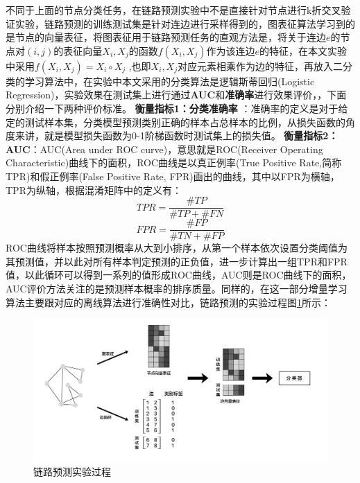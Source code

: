 不同于上面的节点分类任务，在链路预测实验中不是直接针对节点进行k折交叉验证实验，链路预测的训练测试集是针对连边进行采样得到的，图表征算法学习到的是节点的向量表征，将图表征用于链路预测任务的直观方法是，将关于连边$e$的节点对$(i,j)$的表征向量$X_i,X_j$的函数$f(X_i, X_j)$作为该连边$e$的特征，在本文实验中采用$f(X_i, X_j) = X_i\circ X_j$ ,也即$X_i, X_j$对应元素相乘作为边的特征，再放入二分类的学习算法中，在实验中本文采用的分类算法是逻辑斯蒂回归(Logistic Regression)，实验效果在测试集上进行通过\textbf{AUC}和\textbf{准确率}进行效果评价，，下面分别介绍一下两种评价标准。
{\textbf{衡量指标1：分类准确率}} ：准确率的定义是对于给定的测试样本集，分类模型预测类别正确的样本占总样本的比例，从损失函数的角度来讲，就是模型损失函数为0-1阶梯函数时测试集上的损失值。
\textbf{衡量指标2：AUC}：AUC(Area under ROC curve)，意思就是ROC(Receiver Operating Characteristic)曲线下的面积，ROC曲线是以真正例率(True Positive Rate,简称TPR)和假正例率(False Positive Rate, FPR)画出的曲线，其中以FPR为横轴，TPR为纵轴，根据混淆矩阵中的定义有：
\begin{equation}
	TPR = \frac{\#TP}{\#TP+\#FN}
\end{equation}
\begin{equation}
FPR = \frac{\#FP}{\#TN+\#FP}
\end{equation}
ROC曲线将样本按照预测概率从大到小排序，从第一个样本依次设置分类阈值为其预测值，并以此对所有样本判定预测的正负值，进一步计算出一组TPR和FPR值，以此循环可以得到一系列的值形成ROC曲线，AUC则是ROC曲线下的面积，AUC评价方法关注的是预测样本概率的排序质量。同样的，在这一部分增量学习算法主要跟对应的离线算法进行准确性对比，链路预测的实验过程图\ref{fig:link_prediction_process}所示：
\begin{figure}
	\centering
	\includegraphics[width=6in]{figures/link_predict_frame}
	\caption{链路预测实验过程}
	\label{fig:link_prediction_process}
\end{figure}

